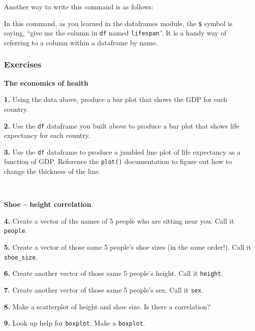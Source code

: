 \documentclass[
]{book}
\newenvironment{Shaded}{\begin{snugshade}}{\end{snugshade}}
\newcommand{\FunctionTok}[1]{\textcolor[rgb]{0.13,0.29,0.53}{\textbf{#1}}}
\newcommand{\NormalTok}[1]{#1}
\newcommand{\SpecialCharTok}[1]{\textcolor[rgb]{0.81,0.36,0.00}{\textbf{#1}}}
\begin{document}
Another way to write this command is as follows:

\begin{Shaded}
\end{Shaded}

In this command, as you learned in the dataframes module, the \texttt{\$} symbol is saying, ``give me the column in \texttt{df} named \texttt{lifespan}''. It is a handy way of referring to a column within a dataframe by name.

\subsubsection*{Exercises}\label{exercises-7}

\textbf{The economics of health}

\textbf{1.} Using the data above, produce a bar plot that shows the GDP for each country.

\textbf{2.} Use the \texttt{df} dataframe you built above to produce a bar plot that shows life expectancy for each country.

\textbf{3.} Use the \texttt{df} dataframe to produce a jumbled line plot of life expectancy as a function of GDP. Reference the \texttt{plot()} documentation to figure out how to change the thickness of the line.

~

\textbf{Shoe \textasciitilde{} height correlation}

\textbf{4.} Create a vector of the names of 5 people who are sitting near you. Call it \texttt{people}.

\textbf{5.} Create a vector of those same 5 people's shoe sizes (in the same order!). Call it \texttt{shoe\_size}.

\textbf{6.} Create another vector of those same 5 people's height. Call it \texttt{height}.

\textbf{7.} Create another vector of those same 5 people's sex. Call it \texttt{sex}.

\textbf{8.} Make a scatterplot of height and shoe size. Is there a correlation?

\textbf{9.} Look up help for \texttt{boxplot}. Make a \texttt{boxplot}.
\end{document}

